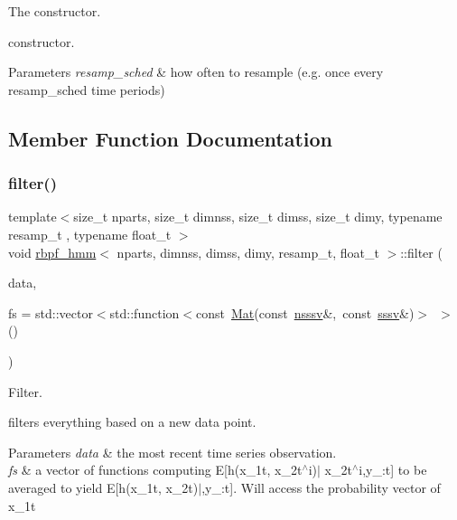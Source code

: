 The constructor. 

constructor. 
\begin{DoxyParams}{Parameters}
{\em resamp\+\_\+sched} & how often to resample (e.\+g. once every resamp\+\_\+sched time periods) \\
\hline
\end{DoxyParams}


\subsection{Member Function Documentation}
\mbox{\label{classrbpf__hmm_a74864b32274b746d281295c293a28cdd}} 
\subsubsection{\texorpdfstring{filter()}{filter()}}
{\footnotesize\ttfamily template$<$size\+\_\+t nparts, size\+\_\+t dimnss, size\+\_\+t dimss, size\+\_\+t dimy, typename resamp\+\_\+t , typename float\+\_\+t $>$ \\
void \hyperlink{classrbpf__hmm}{rbpf\+\_\+hmm}$<$ nparts, dimnss, dimss, dimy, resamp\+\_\+t, float\+\_\+t $>$\+::filter (\begin{DoxyParamCaption}\item[{const \hyperlink{classrbpf__hmm_adafd37687fdd3bb776d3d33a5b0e7080}{osv} \&}]{data,  }\item[{const std\+::vector$<$ std\+::function$<$ const \hyperlink{classrbpf__hmm_ac32aaf9833767d6886f732243a77aa66}{Mat}(const \hyperlink{classrbpf__hmm_a7988465662f94f2ba45fd22566828d0f}{nsssv} \&x1t\+Probs, const \hyperlink{classrbpf__hmm_a28e8ad1d93bcf53cb74603f74826a81c}{sssv} \&x2t)$>$ $>$ \&}]{fs = {\ttfamily std\+:\+:vector$<$std\+:\+:function$<$const~\hyperlink{classrbpf__hmm_ac32aaf9833767d6886f732243a77aa66}{Mat}(const~\hyperlink{classrbpf__hmm_a7988465662f94f2ba45fd22566828d0f}{nsssv}\&,~const~\hyperlink{classrbpf__hmm_a28e8ad1d93bcf53cb74603f74826a81c}{sssv}\&)$>$~$>$()} }\end{DoxyParamCaption})}



Filter. 

filters everything based on a new data point. 
\begin{DoxyParams}{Parameters}
{\em data} & the most recent time series observation. \\
\hline
{\em fs} & a vector of functions computing E\mbox{[}h(x\+\_\+1t, x\+\_\+2t$^\wedge$i)$\vert$ x\+\_\+2t$^\wedge$i,y\+\_\+:t\mbox{]} to be averaged to yield E\mbox{[}h(x\+\_\+1t, x\+\_\+2t)$\vert$,y\+\_\+:t\mbox{]}. Will access the probability vector of x\+\_\+1t \\
\hline
\end{DoxyParams}
\mbox{\label{classrbpf__hmm_a98b2d1e39e0a092a000866d1cda7e701}} 
